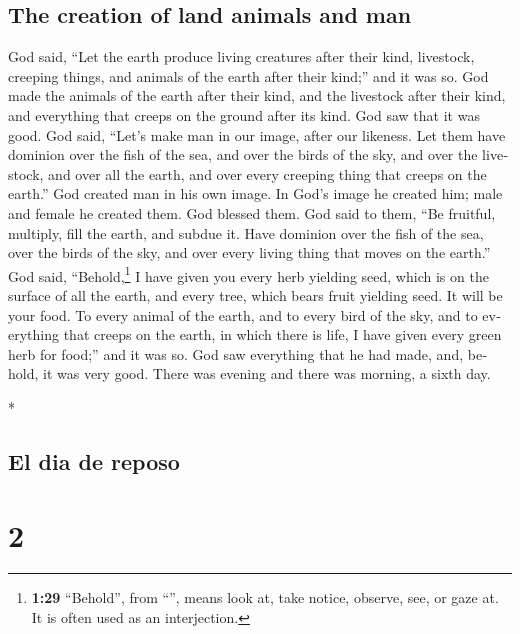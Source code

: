 \begin{paracol}{2}
\begin{otherlanguage}{english}
\hypertarget{the-creation-of-land-animals-and-man}{%
\subsection{The creation of land animals and
man}\label{the-creation-of-land-animals-and-man}}

 God said, ``Let the earth produce living creatures after
their kind, livestock, creeping things, and animals of the earth after
their kind;'' and it was so.  God made the animals of the
earth after their kind, and the livestock after their kind, and
everything that creeps on the ground after its kind. God saw that it was
good.  God said, ``Let's make man in our image, after our
likeness. Let them have dominion over the fish of the sea, and over the
birds of the sky, and over the livestock, and over all the earth, and
over every creeping thing that creeps on the earth.'' 
God created man in his own image. In God's image he created him; male
and female he created them.  God blessed them. God said
to them, ``Be fruitful, multiply, fill the earth, and subdue it. Have
dominion over the fish of the sea, over the birds of the sky, and over
every living thing that moves on the earth.''  God said,
``Behold,\footnote{\textbf{1:29} ``Behold'', from ``'',
  means look at, take notice, observe, see, or gaze at. It is often used
  as an interjection.} I have given you every herb yielding seed, which
is on the surface of all the earth, and every tree, which bears fruit
yielding seed. It will be your food.  To every animal of
the earth, and to every bird of the sky, and to everything that creeps
on the earth, in which there is life, I have given every green herb for
food;'' and it was so.  God saw everything that he had
made, and, behold, it was very good. There was evening and there was
morning, a sixth day.

\end{otherlanguage}

\switchcolumn[0]*

\hypertarget{el-dia-de-reposo}{%
\subsection{El dia de reposo}\label{el-dia-de-reposo}}

\hypertarget{section-2}{%
\section{2}\label{section-2}}


\end{paracol}
